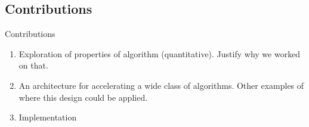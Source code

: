 \subsection{Contributions}
\begin{frame}{Contributions}
    \begin{enumerate}
        \item Exploration of properties of algorithm (quantitative). Justify why we worked on that.
        \item An architecture for accelerating a wide class of algorithms. Other examples of where this design could be applied.
        \item Implementation
    \end{enumerate}
\end{frame}

\begin{comment}
\subsection{Pros and Cons}
\begin{frame}
\end{frame}
\end{comment}